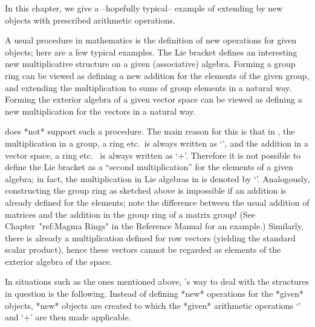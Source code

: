 

In this chapter, we give a --hopefully typical--
example of extending {\GAP} by new objects with prescribed
arithmetic operations.



A usual procedure in mathematics is the definition of new operations for
given objects;
here are a few typical examples.
The Lie bracket defines an interesting new multiplicative
structure on a given (associative) algebra.
Forming a group ring can be viewed as defining a new addition for the
elements of the given group, and extending the multiplication to sums
of group elements in a natural way.
Forming the exterior algebra of a given vector space can be viewed as
defining a new multiplication for the vectors in a natural way.

{\GAP} does *not* support such a procedure.
The main reason for this is that in {\GAP}, the multiplication in a group,
a ring etc.~is always written as `\*',
and the addition in a vector space, a ring etc.~ is always written as `+'.
Therefore it is not possible to define the Lie bracket as a
``second multiplication'' for the elements of a given algebra;
in fact, the multiplication in Lie algebras in {\GAP} is denoted by `\*'.
Analogously, constructing the group ring as sketched above is impossible
if an addition is already defined for the elements;
note the difference between the usual addition of matrices and the
addition in the group ring of a matrix group!
(See Chapter~"ref:Magma Rings" in the Reference Manual for an example.)
Similarly, there is already a multiplication defined for row vectors
(yielding the standard scalar product), hence these vectors cannot be
regarded as elements of the exterior algebra of the space.

In situations such as the ones mentioned above,
{\GAP}'s way to deal with the structures in question is the following.
Instead of defining *new* operations for the *given* objects,
*new* objects are created to which the *given* arithmetic operations
`\*' and `+' are then made applicable.

